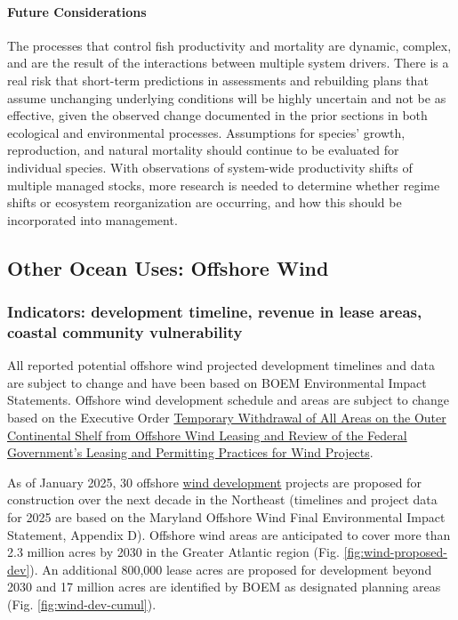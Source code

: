 \documentclass[
  10pt,
]{article}
\begin{document}
\paragraph{Future Considerations}\label{future-considerations-2}

The processes that control fish productivity and mortality are dynamic, complex, and are the result of the interactions between multiple system drivers. There is a real risk that short-term predictions in assessments and rebuilding plans that assume unchanging underlying conditions will be highly uncertain and not be as effective, given the observed change documented in the prior sections in both ecological and environmental processes. Assumptions for species' growth, reproduction, and natural mortality should continue to be evaluated for individual species. With observations of system-wide productivity shifts of multiple managed stocks, more research is needed to determine whether regime shifts or ecosystem reorganization are occurring, and how this should be incorporated into management.

\subsection{Other Ocean Uses: Offshore Wind}\label{other-ocean-uses-offshore-wind}

\subsubsection{Indicators: development timeline, revenue in lease areas, coastal community vulnerability}\label{indicators-development-timeline-revenue-in-lease-areas-coastal-community-vulnerability}

All reported potential offshore wind projected development timelines and data are subject to change and have been based on BOEM Environmental Impact Statements. Offshore wind development schedule and areas are subject to change based on the Executive Order \href{https://www.whitehouse.gov/presidential-actions/2025/01/temporary-withdrawal-of-all-areas-on-the-outer-continental-shelf-from-offshore-wind-leasing-and-review-of-the-federal-governments-leasing-and-permitting-practices-for-wind-projects/}{Temporary Withdrawal of All Areas on the Outer Continental Shelf from Offshore Wind Leasing and Review of the Federal Government's Leasing and Permitting Practices for Wind Projects}.

As of January 2025, 30 offshore \href{https://noaa-edab.github.io/catalog/wind_dev_speed.html}{wind development} projects are proposed for construction over the next decade in the Northeast (timelines and project data for 2025 are based on the Maryland Offshore Wind Final Environmental Impact Statement, Appendix D). Offshore wind areas are anticipated to cover more than 2.3 million acres by 2030 in the Greater Atlantic region (Fig. \ref{fig:wind-proposed-dev}). An additional 800,000 lease acres are proposed for development beyond 2030 and 17 million acres are identified by BOEM as designated planning areas (Fig. \ref{fig:wind-dev-cumul}).
\end{document}
